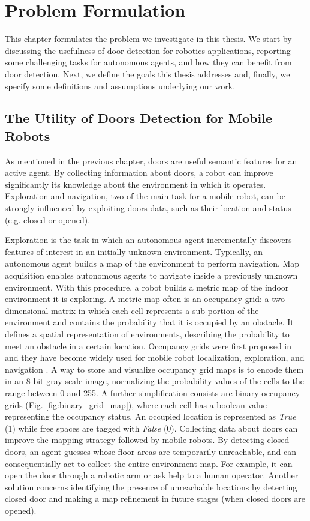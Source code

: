 \chapter{Problem Formulation}
\label{capitolo3}
\thispagestyle{empty}

This chapter formulates the problem we investigate in this thesis. We start by discussing the usefulness of door detection for robotics applications, reporting some challenging tasks for autonomous agents, and how they can benefit from door detection. Next, we define the goals this thesis addresses and, finally, we specify some definitions and assumptions underlying our work.

\section{The Utility of Doors Detection for Mobile Robots}

As mentioned in the previous chapter, doors are useful semantic features for an active agent. By collecting information about doors, a robot can improve significantly its knowledge about the environment in which it operates. Exploration and navigation, two of the main task for a mobile robot, can be strongly influenced by exploiting doors data, such as their location and status (e.g. closed or opened). 

Exploration is the task in which an autonomous agent incrementally discovers features of interest in an initially unknown environment. Typically, an autonomous agent builds a map of the environment to perform navigation.  Map acquisition enables autonomous agents to navigate inside a previously unknown environment. With this procedure, a robot builds a metric map of the indoor environment it is exploring. A metric map often is an occupancy grid: a two-dimensional matrix in which each cell represents a sub-portion of the environment and contains the probability that it is occupied by an obstacle. It defines a spatial representation of environments, describing the probability to meet an obstacle in a certain location. Occupancy grids were first proposed in \cite{cuupancygridfirst} and they have become widely used for mobile robot localization, exploration, and navigation \cite{gridmapnavigation, ariel, girdmapexploration}. A way to store and visualize occupancy grid maps is to encode them in an 8-bit gray-scale image, normalizing the probability values of the cells to the range between 0
and 255. A further simplification consists are binary occupancy grids (Fig. \ref{fig:binary_grid_map}), where each cell has a boolean value representing the occupancy status. An occupied location is represented as \textit{True} (1) while free spaces are tagged with \textit{False} (0). Collecting data about doors can improve the mapping strategy followed by mobile robots. By detecting closed doors, an agent guesses whose floor areas are temporarily unreachable, and can consequentially act to collect the entire environment map. For example, it can open the door through a robotic arm \cite{doorcabinet} or ask help to a human operator. Another solution concerns identifying the presence of unreachable locations by detecting closed door and making a map refinement in future stages (when closed doors are opened).

